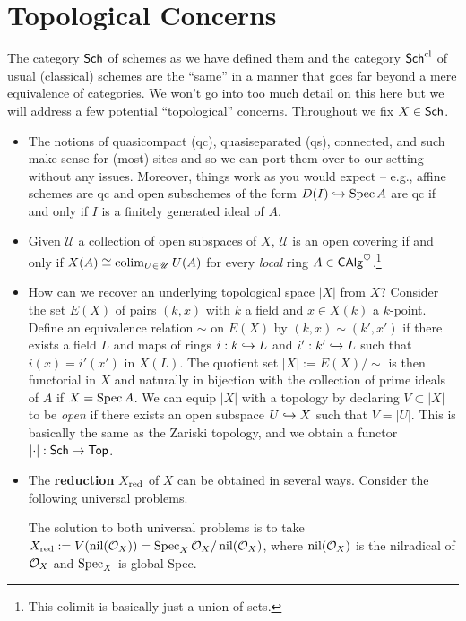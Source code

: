 \documentclass[11pt]{article}
\newcommand{\UU}{\mathscr{U}}
\begin{document}
\section{Topological Concerns}
The category $\operatorname{\mathsf{Sch}}$ of schemes as we have defined them and the category $\operatorname{\mathsf{Sch}}^{\operatorname{cl}}$ of usual (classical) schemes are the ``same'' in a manner that goes far beyond a mere equivalence of categories. We won't go into too much detail on this here but we will address a few potential ``topological'' concerns. Throughout we fix $X\in\operatorname{\mathsf{Sch}}$. 
\begin{itemize}
\item The notions of quasicompact (qc), quasiseparated (qs), connected, and such make sense for (most) sites and so we can port them over to our setting without any issues. Moreover, things work as you would expect -- e.g., affine schemes are qc and open subschemes of the form $D(I)\hookrightarrow\operatorname{Spec} A$ are qc if and only if $I$ is a finitely generated ideal of $A$. 

\item Given $\UU$ a collection of open subspaces of $X$, $\UU$ is an open covering if and only if $X(A)\iso\colim_{U\in\UU}U(A)$ for every \emph{local} ring $A\in\operatorname{\mathsf{CAlg}}^{\heartsuit}$.\footnote{This colimit is basically just a union of sets.}

\item How can we recover an underlying topological space $|X|$ from $X$? Consider the set $E(X)$ of pairs $(k,x)$ with $k$ a field and $x\in X(k)$ a $k$-point. Define an equivalence relation $\sim$ on $E(X)$ by $(k,x)\sim(k',x')$ if there exists a field $L$ and maps of rings $i: k\hookrightarrow L$ and $i': k'\hookrightarrow L$ such that $i(x)=i'(x')$ in $X(L)$. The quotient set $|X|:=E(X)/\!\sim$ is then functorial in $X$ and naturally in bijection with the collection of prime ideals of $A$ if $X=\operatorname{Spec} A$. We can equip $|X|$ with a topology by declaring $V\subset|X|$ to be \emph{open} if there exists an open subspace $U\hookrightarrow X$ such that $V=|U|$. This is basically the same as the Zariski topology, and we obtain a functor $\left\lvert\cdot\right\rvert: \operatorname{\mathsf{Sch}}\to\operatorname{\mathsf{Top}}$.

\item The \textbf{reduction} $X_{\operatorname{red}}$ of $X$ can be obtained in several ways. Consider the following universal problems.
The solution to both universal problems is to take $X_{\operatorname{red}}:=V(\operatorname{nil}(\mathcal{O}_X))=\operatorname{Spec}_X\mathcal{O}_X/\operatorname{nil}(\mathcal{O}_X)$, where $\operatorname{nil}(\mathcal{O}_X)$ is the nilradical of $\mathcal{O}_X$ and $\operatorname{Spec}_X$ is global Spec.


\end{itemize}
\end{document}
